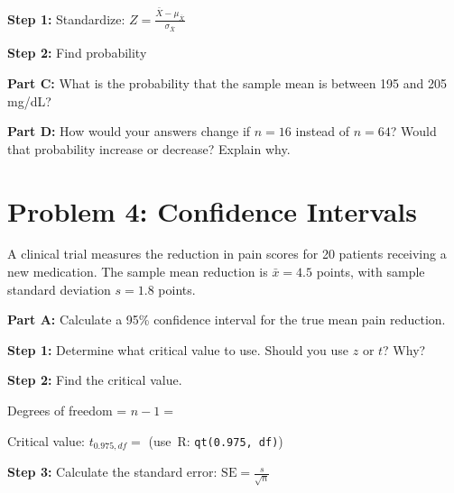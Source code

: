 \documentclass[11pt]{article}
\begin{document}
\textbf{Step 1:} Standardize: $Z = \frac{\bar{X} - \mu_{\bar{X}}}{\sigma_{\bar{X}}}$

\vspace{2cm}

\textbf{Step 2:} Find probability

\vspace{2cm}

\textbf{Part C:} What is the probability that the sample mean is between 195 and 205 mg/dL?

\vspace{3.5cm}

\textbf{Part D:} How would your answers change if $n = 16$ instead of $n = 64$? Would that probability increase or decrease? Explain why.

\vspace{3cm}

\newpage

\section{Problem 4: Confidence Intervals}

A clinical trial measures the reduction in pain scores for 20 patients receiving a new medication. The sample mean reduction is $\bar{x} = 4.5$ points, with sample standard deviation $s = 1.8$ points.

\vspace{6pt}

\textbf{Part A:} Calculate a 95\% confidence interval for the true mean pain reduction.

\vspace{0.3cm}

\textbf{Step 1:} Determine what critical value to use. Should you use $z$ or $t$? Why?

\vspace{2cm}

\textbf{Step 2:} Find the critical value.

\vspace{0.3cm}

Degrees of freedom = $n - 1 = $

\vspace{0.5cm}

Critical value: $t_{0.975, df} = $ \hspace{1cm} (use~R: \texttt{qt(0.975,~df)})

\vspace{1.5cm}

\textbf{Step 3:} Calculate the standard error: $\text{SE} = \frac{s}{\sqrt{n}}$
\end{document}
